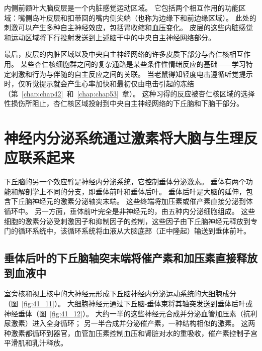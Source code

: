 内侧前额叶大脑皮层是一个内脏感觉运动区域。
它包括两个相互作用的功能区域：嘴侧岛叶皮层和扣带回的嘴内侧尖端（也称为边缘下和前边缘区域）。
此处的刺激可以产生多种自主神经效应，包括胃收缩和血压变化。
皮层的这些内脏感觉和运动区域将下行投射发送到上述脑干中的中央自主神经网络部分。


最后，皮层的内脏区域以及中央自主神经网络的许多皮质下部分与杏仁核相互作用。
某些杏仁核细胞群之间的复杂通路是某些条件性情绪反应的基础——学习特定刺激和行为与伴随的自主反应之间的关联。
当老鼠得知轻度电击遵循听觉提示时，仅听觉提示就会产生心率加快和最初仅由电击引起的冻结（第~\ref{chap:chap42}~和~\ref{chap:chap53}~章）。
这种习得的反应被杏仁核区域的选择性损伤所阻止，杏仁核区域投射到中央自主神经网络的下丘脑和下脑干部分。



\section{神经内分泌系统通过激素将大脑与生理反应联系起来}

下丘脑的另一个效应臂是神经内分泌系统，它控制垂体分泌激素。
垂体有两个功能和解剖学上不同的分支，即垂体前叶和垂体后叶。
垂体后叶是大脑的延伸，包含下丘脑神经元的激素分泌轴突末端。
这些终端将加压素或催产素直接分泌到体循环中。
另一方面，垂体前叶完全是非神经元的，由五种内分泌细胞组成。
这些细胞的激素分泌受刺激因子和抑制因子的控制，这些因子由下丘脑神经元释放到专门的循环系统中，该循环系统将血液从大脑底部（正中隆起）输送到垂体前叶。



\subsection{垂体后叶的下丘脑轴突末端将催产素和加压素直接释放到血液中}

室旁核和视上核中的大神经元形成下丘脑神经内分泌运动系统的大细胞成分（图~\ref{fig:41_11}）。
大细胞神经元通过下丘脑-垂体束将其轴突发送到垂体后叶或神经垂体（图~\ref{fig:41_12}）。
大约一半的这些神经元合成并分泌血管加压素（抗利尿激素）进入全身循环；
另一半合成并分泌催产素，一种结构相似的激素。
这两种激素都循环到器官，血管加压素控制血压和肾脏对水的重吸收，催产素控制子宫平滑肌和乳汁释放。


